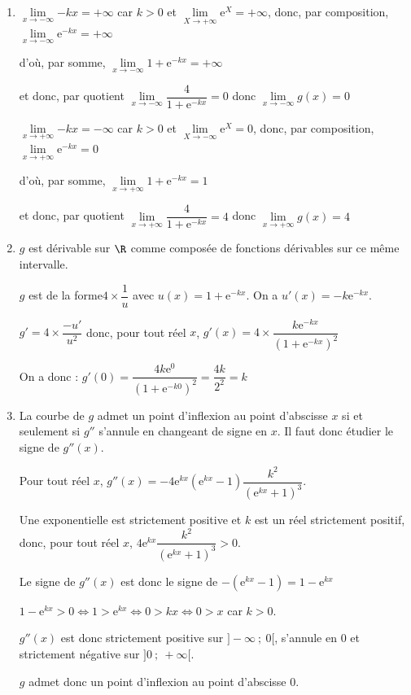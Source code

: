\begin{enumerate}
\item $\lim\limits_{x \to -\infty}{-kx}=+\infty$  car $k>0$ et $\lim\limits_{X\to +\infty}{\mathrm{e}^X}=+\infty$, donc, par composition, $\lim\limits_{x\to -\infty}{ \mathrm{e}^{-kx}}= +\infty$

d'où, par somme, $\lim\limits_{x\to -\infty} 1+ \mathrm{e}^{-kx}=+\infty$

et donc, par quotient $\lim\limits_{x\to -\infty}\dfrac{4}{1+\mathrm{e}^{-kx}}=0$ \hfill{donc  $\lim\limits_{x\to -\infty}g(x)=0$}


$\lim\limits_{x \to +\infty}{-kx}=-\infty$  car $k>0$ et $\lim\limits_{X\to -\infty}{\mathrm{e}^X}=0$, donc, par composition, $\lim\limits_{x\to +\infty}{ \mathrm{e}^{-kx}}=0$

	d'où, par somme, $\lim\limits_{x\to +\infty} 1+ \mathrm{e}^{-kx}=1$

	et donc, par quotient $\lim\limits_{x\to +\infty}\dfrac{4}{1+\mathrm{e}^{-kx}}=4$ \hfill donc  $\lim\limits_{x\to +\infty}g(x)=4$


\item  $g$ est dérivable sur $\R$ comme composée de fonctions dérivables sur ce même intervalle. 

$g$ est de la forme$4\times \dfrac{1}{u}$ avec $u(x)=1+\mathrm{e}^{-kx}$. On a $u'(x)=-k \mathrm{e}^{-kx}$.

$g'=4\times \dfrac{-u'}{u^2}$ donc, pour tout réel $x$,  $g'(x)=4\times \dfrac{k \mathrm{e}^{-kx}}{{\left(1+ \mathrm{e}^{-kx}\right)} ^2}$ 

On a donc : $g'(0)=\dfrac{4k\mathrm{e} ^0}{{\left( 1+ \mathrm{e}^{-k0}\right)} ^2} =\dfrac{4k}{2^2}=k$ 

\item  La courbe de $g$ admet un point d'inflexion au point d'abscisse $x$ si et seulement si $g''$ s'annule en changeant de signe en $x$.  Il faut donc étudier le signe de $g''(x)$. 

Pour tout réel $x$,  $g''(x)=-4 \mathrm{e}^{kx} \left( \mathrm{e}^{kx} -1 \right) \dfrac{k^2}{ { \left( \mathrm{e}^{kx}+1 \right)}^3}$. 

Une exponentielle est strictement positive  et $k$ est un réel strictement positif, donc, pour tout réel $x$,  $ 4\mathrm{e}^{kx} \dfrac{k^2}{ { \left( \mathrm{e}^{kx}+1 \right)}^3} >0$.

Le signe de $g''(x)$ est donc le signe de $-\left( \mathrm{e}^{kx} -1 \right)= 1-\mathrm{e}^{kx}$

$1-\mathrm{e}^{kx} > 0 \iff 1>\mathrm{e}^{kx} \iff 0>kx \iff 0>x$ car $k>0$.

$g''(x)$ est donc  strictement positive sur $]-\infty~;~ 0[$, s'annule en 0 et strictement négative sur $]0~;~+\infty[$.

$g$ admet donc un point d'inflexion au point d'abscisse 0.
\end{enumerate}

\bigskip
